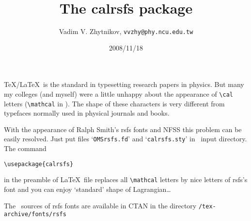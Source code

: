 \documentclass[DIV=8, fontsize=12, pagesize=auto]{scrartcl}
\title{The \textsf{calrsfs} package}
\author{Vadim V. Zhytnikov, \texttt{vvzhy@phy.ncu.edu.tw}}
\date{2008/11/18}
\begin{document}
\maketitle

\noindent
\TeX/\LaTeX\ is the standard in typesetting research 
papers in physics. But many my colleges (and myself) were 
a little unhappy about the appearance of \verb+\cal+ letters 
(\verb+\mathcal+ in \LaTeXe). The shape of these characters is 
very different from typefaces normally used in physical 
journals and books.

With the appearance of Ralph Smith's \textsf{rsfs} fonts and
NFSS this problem can be easily resolved. Just put files
`\texttt{OMSrsfs.fd}' and `\texttt{calrsfs.sty}' in \LaTeXe\ input directory.
The command
%
\begin{verbatim}
\usepackage{calrsfs}
\end{verbatim}
%
in the preamble of \LaTeX\ file replaces all \verb+\mathcal+
letters by nice letters of \textsf{rsfs}'s font and you can enjoy
`standard' shape of Lagrangian\ldots

The \MF\ sources of \textsf{rsfs} fonts are available in CTAN
in  the directory \texttt{/tex-archive/fonts/rsfs}
\end{document}

